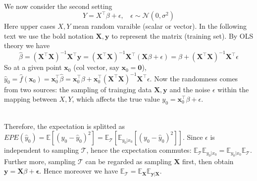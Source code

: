 \documentclass[a4paper, 11pt]{article}
\begin{document}
~\\
We now consider the second setting
$$
Y = X^{\top} \beta + \epsilon,~~~~\epsilon\sim \mathcal{N}(0, \sigma^2)
$$
Here upper cases $X,Y$ mean random varaible (scalar or vector). In the following text we use the bold notation $\bm{X}, \bm{y}$ to represent the matrix (training set). By OLS theory we have
$$
\hat{\beta} = (\bm{X}^{\top}\bm{X})^{-1} \bm{X}^{\top} \bm{y} = (\bm{X}^{\top}\bm{X})^{-1} \bm{X}^{\top} (\bm{X}\beta + \epsilon) = \beta + (\bm{X}^{\top}\bm{X})^{-1} \bm{X}^{\top} \epsilon
$$
So at a given point $\bm{x}_0$ (col vector, say $\bm{x}_0=\bm{0}$), $\hat{y}_0=\hat{f}(\bm{x}_0)=\bm{x}^{\top}_0\hat{\beta}=\bm{x}_0^{\top} \beta + \bm{x}_0^{\top}(\bm{X}^{\top}\bm{X})^{-1} \bm{X}^{\top}\epsilon$. Now the randomness comes from two sources: the sampling of trainging data $\bm{X}, \bm{y}$ and the noise $\epsilon$ within the mapping between $X,Y$, which affects the true value $y_0=\bm{x}_0^{\top}\beta+\epsilon$. 

~\\
Therefore, the expectation is splitted as $EPE(\hat{y}_0) = \mathbb{E}\left[(y_0-\hat{y}_0)^2\right] = \mathbb{E}_{\mathcal{T}}\left[\mathbb{E}_{y_0|x_0}\left[(y_0-\hat{y}_0)^2\right]\right]$. Since $\epsilon$ is independent to sampling $\mathcal{T}$, hence the expectation commutes: $\mathbb{E}_{\mathcal{T}}\mathbb{E}_{y_0|x_0} = \mathbb{E}_{y_0|x_0}\mathbb{E}_{\mathcal{T}}$. Further more, sampling $\mathcal{T}$ can be regarded as sampling $\bm{X}$ first, then obtain $\bm{y}=\bm{X}\beta+\bm{\epsilon}$. Hence moreover we have $\mathbb{E}_{\mathcal{T}}=\mathbb{E}_{\bm{X}}\mathbb{E}_{\bm{y}|\bm{X}}$.
\end{document}
